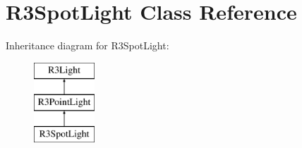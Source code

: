 \hypertarget{class_r3_spot_light}{}\section{R3\+Spot\+Light Class Reference}
\label{class_r3_spot_light}
Inheritance diagram for R3\+Spot\+Light\+:\begin{figure}[H]
\begin{center}
\leavevmode
\includegraphics[height=3.000000cm]{class_r3_spot_light}
\end{center}
\end{figure}
